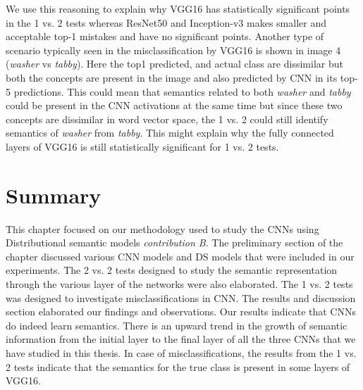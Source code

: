 We use this reasoning to explain why VGG16 has statistically significant points in the 1 vs. 2 tests whereas ResNet50 and Inception-v3 makes smaller and acceptable top-1 mistakes and have no significant points. Another type of scenario typically seen in the misclassification by VGG16 is shown in image 4 (\textit{washer} vs \textit{tabby}). Here the top1 predicted, and actual class are dissimilar but both the concepts are present in the image and also predicted by CNN in its top-5 predictions. This could mean that semantics related to both \textit{washer} and \textit{tabby} could be present in the CNN activations at the same time but since these two concepts are dissimilar in word vector space, the 1 vs. 2 could still identify semantics of \textit{washer} from \textit{tabby}. This might explain why the fully connected layers of VGG16 is still statistically significant for 1 vs. 2 tests.

\section{Summary}


 This chapter focused on our methodology used to study the CNNs using Distributional semantic models \textit{contribution B}. The preliminary section of the chapter discussed various CNN models and DS models that were included in our experiments. The 2 vs. 2 tests designed to study the semantic representation through the various layer of the networks were also elaborated. The 1 vs. 2 tests was designed to investigate misclassifications in CNN. The results and discussion section elaborated our findings and observations. Our results indicate that CNNs do indeed learn semantics. There is an upward trend in the growth of semantic information from the initial layer to the final layer of all the three CNNs that we have studied in this thesis. In case of misclassifications, the results from the 1 vs. 2 tests indicate that the semantics for the true class is present in some layers of VGG16.
